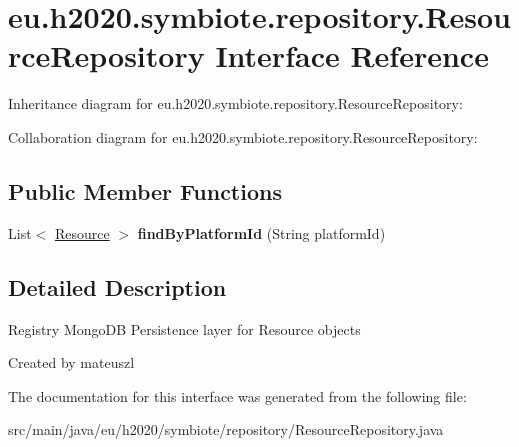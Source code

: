 \hypertarget{interfaceeu_1_1h2020_1_1symbiote_1_1repository_1_1ResourceRepository}{}\section{eu.\+h2020.\+symbiote.\+repository.\+Resource\+Repository Interface Reference}
\label{interfaceeu_1_1h2020_1_1symbiote_1_1repository_1_1ResourceRepository}


Inheritance diagram for eu.\+h2020.\+symbiote.\+repository.\+Resource\+Repository\+:


Collaboration diagram for eu.\+h2020.\+symbiote.\+repository.\+Resource\+Repository\+:
\subsection*{Public Member Functions}
\begin{DoxyCompactItemize}
\item 
List$<$ \hyperlink{classeu_1_1h2020_1_1symbiote_1_1model_1_1Resource}{Resource} $>$ {\bfseries find\+By\+Platform\+Id} (String platform\+Id)\hypertarget{interfaceeu_1_1h2020_1_1symbiote_1_1repository_1_1ResourceRepository_aec7bce58cf66e21ad20c28041306c089}{}\label{interfaceeu_1_1h2020_1_1symbiote_1_1repository_1_1ResourceRepository_aec7bce58cf66e21ad20c28041306c089}

\end{DoxyCompactItemize}


\subsection{Detailed Description}
Registry Mongo\+DB Persistence layer for Resource objects

Created by mateuszl 

The documentation for this interface was generated from the following file\+:\begin{DoxyCompactItemize}
\item 
src/main/java/eu/h2020/symbiote/repository/Resource\+Repository.\+java\end{DoxyCompactItemize}
